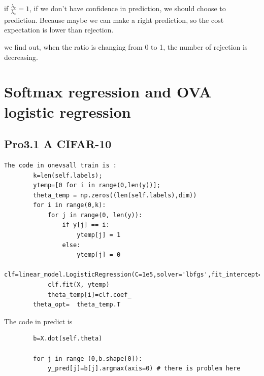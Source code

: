 \documentclass[pdftex,11pt]{article}
\begin{document}
if $\frac{\lambda_{r}}{\lambda_{s}}=1$, if we don't have confidence in prediction, we should choose to prediction. Because maybe we can make a right prediction, so the cost expectation is lower than rejection.

we find out, when the ratio is changing from 0 to 1, the number of rejection is decreasing.


\section{Softmax regression and OVA logistic regression}
\subsection*{Pro3.1 A CIFAR-10}
\begin{lstlisting}
The code in onevsall train is :
        k=len(self.labels);
        ytemp=[0 for i in range(0,len(y))];
        theta_temp = np.zeros((len(self.labels),dim))
        for i in range(0,k):
            for j in range(0, len(y)):
                if y[j] == i:
                    ytemp[j] = 1
                else:
                    ytemp[j] = 0
            clf=linear_model.LogisticRegression(C=1e5,solver='lbfgs',fit_intercept=False)
            clf.fit(X, ytemp)
            theta_temp[i]=clf.coef_
        theta_opt=  theta_temp.T
\end{lstlisting}    
 The code in predict is
\begin{lstlisting} 
        b=X.dot(self.theta)
        
        for j in range (0,b.shape[0]):
            y_pred[j]=b[j].argmax(axis=0) # there is problem here
               
\end{lstlisting}  
\end{document}
